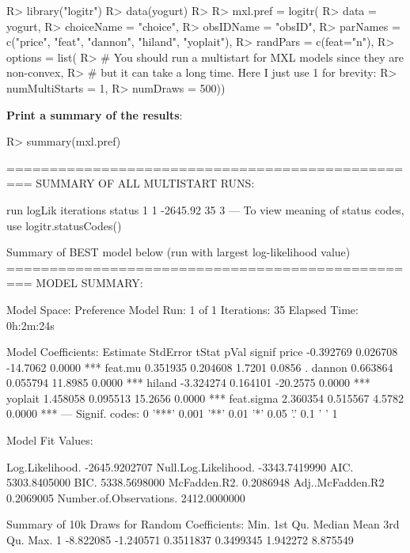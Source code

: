 \documentclass[article]{jss}
\begin{document}
\begin{CodeChunk}

\begin{CodeInput}
R> library("logitr")
R> data(yogurt)
R> 
R> mxl.pref = logitr(
R>     data       = yogurt,
R>     choiceName = "choice",
R>     obsIDName  = "obsID",
R>     parNames   = c("price", "feat", "dannon", "hiland", "yoplait"),
R>     randPars   = c(feat="n"),
R>     options    = list(
R>     # You should run a multistart for MXL models since they are non-convex,
R>     # but it can take a long time. Here I just use 1 for brevity:
R>         numMultiStarts = 1,
R>         numDraws       = 500))
\end{CodeInput}
\end{CodeChunk}

\textbf{Print a summary of the results}:

\begin{CodeChunk}

\begin{CodeInput}
R> summary(mxl.pref)
\end{CodeInput}

\begin{CodeOutput}
=================================================
SUMMARY OF ALL MULTISTART RUNS:

  run   logLik iterations status
1   1 -2645.92         35      3
---
To view meaning of status codes, use logitr.statusCodes() 

Summary of BEST model below (run with largest log-likelihood value)
=================================================
MODEL SUMMARY: 
                        
Model Space:  Preference
Model Run:        1 of 1
Iterations:           35
Elapsed Time:  0h:2m:24s

Model Coefficients: 
            Estimate StdError    tStat   pVal signif
price      -0.392769 0.026708 -14.7062 0.0000    ***
feat.mu     0.351935 0.204608   1.7201 0.0856      .
dannon      0.663864 0.055794  11.8985 0.0000    ***
hiland     -3.324274 0.164101 -20.2575 0.0000    ***
yoplait     1.458058 0.095513  15.2656 0.0000    ***
feat.sigma  2.360354 0.515567   4.5782 0.0000    ***
---
Signif. codes:  0 '***' 0.001 '**' 0.01 '*' 0.05 '.' 0.1 ' ' 1

Model Fit Values: 
                                     
Log.Likelihood.         -2645.9202707
Null.Log.Likelihood.    -3343.7419990
AIC.                     5303.8405000
BIC.                     5338.5698000
McFadden.R2.                0.2086948
Adj..McFadden.R2            0.2069005
Number.of.Observations.  2412.0000000

Summary of 10k Draws for Random Coefficients: 
       Min.   1st Qu.    Median      Mean  3rd Qu.     Max.
1 -8.822085 -1.240571 0.3511837 0.3499345 1.942272 8.875549
\end{CodeOutput}
\end{CodeChunk}
\end{document}
